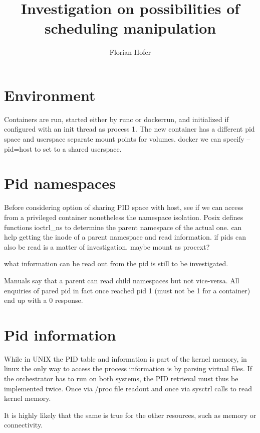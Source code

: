 \documentclass[]{scrartcl}
\title{Investigation on possibilities of scheduling manipulation}
\author{Florian Hofer}
\begin{document}
\maketitle

%

\section{Environment}

Containers are run, started either by runc or dockerrun, and initialized if configured with an init thread as process 1. 
The new container has a different pid space and userspace
separate mount points for volumes. docker we can specify --pid=host to set to a shared userspace.


\section{Pid namespaces}

Before considering option of sharing PID space with host, see if we can access from a privileged container nonetheless the namespace isolation. 
Posix defines functions ioctrl\_ns to determine the parent namespace of the actual one. can help getting the inode of a parent namespace and read information. 
if pids can also be read is a matter of investigation. maybe mount as \/procext?

what information can be read out from the pid is still to be investigated.

Manuals say that a parent can read child namespaces but not vice-versa. All enquiries of pared pid in fact once reached pid 1 (must not be 1 for a container) end up with a 0 response.

\section{Pid information}

While in UNIX the PID table and information is part of the kernel memory, in linux the only way to access the process information is by parsing virtual files. 
If the orchestrator has to run on both systems, the PID retrieval must thus be implemented twice. Once via /proc file readout and once via sysctrl calls to read kernel memory.

It is highly likely that the same is true for the other resources, such as memory or connectivity. 
\end{document}
